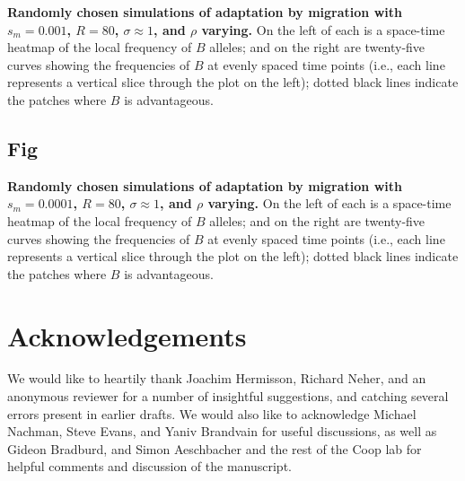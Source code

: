 \documentclass[10pt,letterpaper]{article}
\begin{document}
\textbf{Randomly chosen simulations of adaptation by migration
with $s_m=0.001$, $R=80$, $\sigma\approx 1$, and $\rho$ varying.}
    On the left of each is a space-time heatmap of the local frequency of $B$ alleles;
    and on the right are twenty-five curves showing the frequencies of $B$ at evenly spaced time points
    (i.e., each line represents a vertical slice through the plot on the left);
    dotted black lines indicate the patches where $B$ is advantageous.
\subsection{Fig}
\label{sfig:sims_8}

\textbf{Randomly chosen simulations of adaptation by migration
with $s_m=0.0001$, $R=80$, $\sigma\approx 1$, and $\rho$ varying.}
    On the left of each is a space-time heatmap of the local frequency of $B$ alleles;
    and on the right are twenty-five curves showing the frequencies of $B$ at evenly spaced time points
    (i.e., each line represents a vertical slice through the plot on the left);
    dotted black lines indicate the patches where $B$ is advantageous.


\section*{Acknowledgements}
We would like to heartily thank Joachim Hermisson, Richard Neher, and an anonymous reviewer
for a number of insightful suggestions,
and catching several errors present in earlier drafts. 
We would also like to acknowledge Michael Nachman, Steve Evans, and Yaniv Brandvain for useful discussions, 
as well as Gideon Bradburd, and Simon Aeschbacher and the rest of the Coop lab
for helpful comments and discussion of the manuscript.
\end{document}
